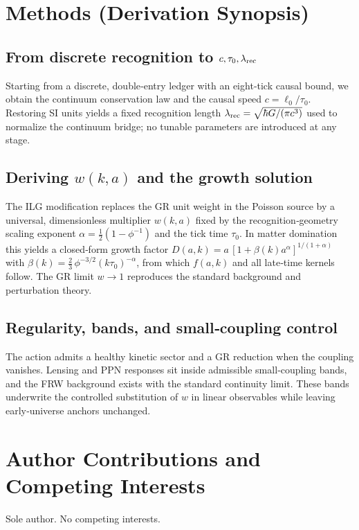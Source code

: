 \documentclass[11pt]{article}
\begin{document}
\section{Methods (Derivation Synopsis)}
\subsection{From discrete recognition to $c,\tau_0,\lambda_{\rm rec}$}
Starting from a discrete, double‑entry ledger with an eight‑tick causal bound, we obtain the continuum conservation law and the causal speed $c=\ell_0/\tau_0$. Restoring SI units yields a fixed recognition length $\lambda_{\rm rec}=\sqrt{\hbar G/(\pi c^3)}$ used to normalize the continuum bridge; no tunable parameters are introduced at any stage.

\subsection{Deriving $w(k,a)$ and the growth solution}\label{sec:linear-growth}
The ILG modification replaces the GR unit weight in the Poisson source by a universal, dimensionless multiplier $w(k,a)$ fixed by the recognition‑geometry scaling exponent $\alpha=\tfrac12(1-\phi^{-1})$ and the tick time $\tau_0$. In matter domination this yields a closed‑form growth factor $D(a,k)=a\,[1+\beta(k)a^\alpha]^{1/(1+\alpha)}$ with $\beta(k)=\tfrac23\,\phi^{-3/2}(k\tau_0)^{-\alpha}$, from which $f(a,k)$ and all late‑time kernels follow. The GR limit $w\!\to\!1$ reproduces the standard background and perturbation theory.

\subsection{Regularity, bands, and small‑coupling control}
The action admits a healthy kinetic sector and a GR reduction when the coupling vanishes. Lensing and PPN responses sit inside admissible small‑coupling bands, and the FRW background exists with the standard continuity limit. These bands underwrite the controlled substitution of $w$ in linear observables while leaving early‑universe anchors unchanged.

\section*{Author Contributions and Competing Interests}
Sole author. No competing interests.



\end{document}
